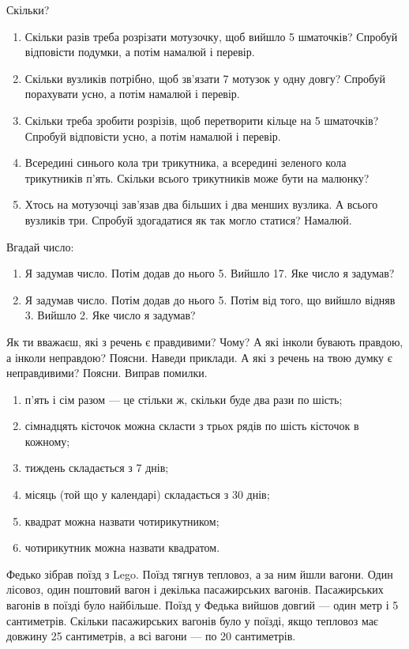 \problem
Скільки?
\begin{enumerate}
    \item Скільки разів треба розрізати мотузочку, щоб вийшло 5 шматочків?
    Спробуй відповісти подумки, а потім намалюй і перевір.
    \item Скільки вузликів потрібно, щоб зв'язати 7 мотузок у одну довгу?
    Спробуй порахувати усно, а потім намалюй і перевір.
    \item Скільки треба зробити розрізів, щоб перетворити кільце
    на 5 шматочків? Спробуй відповісти усно, а потім намалюй і перевір.
    \item Всередині синього кола три трикутника, а всередині зеленого кола
    трикутників п'ять. Скільки всього трикутників може бути на малюнку?
    \item Хтось на мотузочці зав'язав два більших і два менших вузлика.
    А всього вузликів три. Спробуй здогадатися як так могло статися? Намалюй.
\end{enumerate}


\problem
Вгадай число:
\begin{enumerate}
    \item Я задумав число. Потім додав до нього 5. Вийшло 17.
    Яке число я задумав?
    \item Я задумав число. Потім додав до нього 5.
    Потім від того, що вийшло відняв 3. Вийшло 2.
    Яке число я задумав?
\end{enumerate}


\problem
Як ти вважаєш, які з речень є правдивими? Чому?
А які інколи бувають правдою, а інколи неправдою? Поясни. Наведи приклади.
А які з речень на твою думку є неправдивими? Поясни. Виправ помилки.
\begin{enumerate}
    \item п'ять і сім разом --- це стільки ж, скільки буде два рази по шість;
    \item сімнадцять кісточок можна скласти з трьох рядів
    по шість кісточок в кожному;
    \item тиждень складається з 7 днів;
    \item місяць (той що у календарі) складається з 30 днів;
    \item квадрат можна назвати чотирикутником;
    \item чотирикутник можна назвати квадратом.
\end{enumerate}


\problem
Федько зібрав поїзд з Lego. Поїзд тягнув тепловоз, а за ним йшли вагони.
Один лісовоз, один поштовий вагон і декілька пасажирських вагонів.
Пасажирських вагонів в поїзді було найбільше.
Поїзд у Федька вийшов довгий --- один метр і 5 сантиметрів.
Скільки пасажирських вагонів було у поїзді,
якщо тепловоз має довжину 25 сантиметрів, а всі вагони --- по 20 сантиметрів. 


